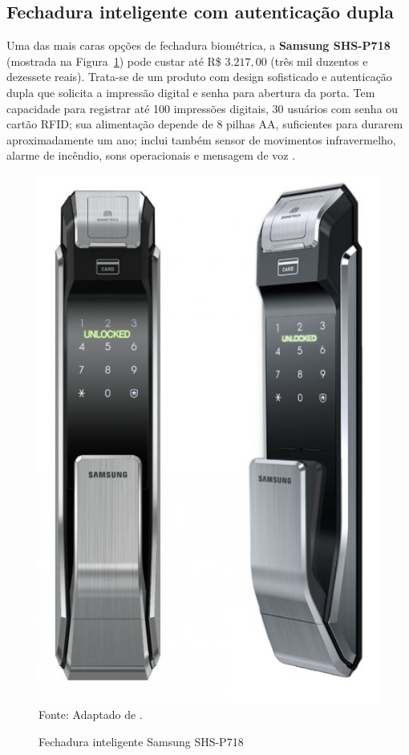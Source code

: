  \subsection{Fechadura inteligente com autenticação dupla}

 Uma das mais caras opções de fechadura biométrica, a \textbf{Samsung SHS-P718} (mostrada na Figura~\ref{samsungshsp718}) pode custar até R{\$} $3.217,00$ (três mil duzentos e dezessete reais). Trata-se de um produto com design sofisticado e autenticação dupla que solicita a impressão digital e senha para abertura da porta. Tem capacidade para registrar até 100 impressões digitais, 30 usuários com senha ou cartão RFID; sua alimentação depende de 8 pilhas AA, suficientes para durarem aproximadamente um ano; inclui também sensor de movimentos infravermelho, alarme de incêndio, sons operacionais e mensagem de voz \cite{samsungshsp718}.

  \begin{figure}[!ht]
  \begin{center}
  \caption{Fechadura inteligente Samsung SHS-P718}
  \includegraphics[scale=1.3]{figuras/cap3/samsungshsp718.jpg}\\
  Fonte: Adaptado de \cite{samsungshsp718}.
  \label{samsungshsp718}
  \end{center}
  \end{figure}


